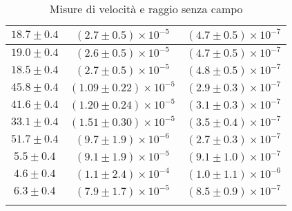 \begin{longtable}[C]{|c|c|c|}
            \hline
            $18.7 \pm 0.4$ & $(2.7 \pm 0.5) \times 10^{-5}$ & $(4.7 \pm 0.5) \times 10^{-7}$ \\
            \hline
            $19.0 \pm 0.4$ & $(2.6 \pm 0.5) \times 10^{-5}$ & $(4.7 \pm 0.5) \times 10^{-7}$ \\
            \hline
            $18.5 \pm 0.4$ & $(2.7 \pm 0.5) \times 10^{-5}$ & $(4.8 \pm 0.5) \times 10^{-7}$ \\
            \hline
            $45.8 \pm 0.4$ & $(1.09 \pm 0.22) \times 10^{-5}$ & $(2.9 \pm 0.3) \times 10^{-7}$ \\
            \hline
            $41.6 \pm 0.4$ & $(1.20 \pm 0.24) \times 10^{-5}$ & $(3.1 \pm 0.3) \times 10^{-7}$ \\
            \hline
            $33.1 \pm 0.4$ & $(1.51 \pm 0.30) \times 10^{-5}$ & $(3.5 \pm 0.4) \times 10^{-7}$ \\
            \hline
            $51.7 \pm 0.4$ & $(9.7 \pm 1.9) \times 10^{-6}$ & $(2.7 \pm 0.3) \times 10^{-7}$ \\
            \hline
            $5.5 \pm 0.4$ & $(9.1 \pm 1.9) \times 10^{-5}$ & $(9.1 \pm 1.0) \times 10^{-7}$ \\
            \hline
            $4.6 \pm 0.4$ & $(1.1 \pm 2.4) \times 10^{-4}$ & $(1.0 \pm 1.1) \times 10^{-6}$ \\
            \hline
            $6.3 \pm 0.4$ & $(7.9 \pm 1.7) \times 10^{-5}$ & $(8.5 \pm 0.9) \times 10^{-7}$ \\
            \hline
            \caption{Misure di velocità e raggio senza campo}
        \end{longtable}


